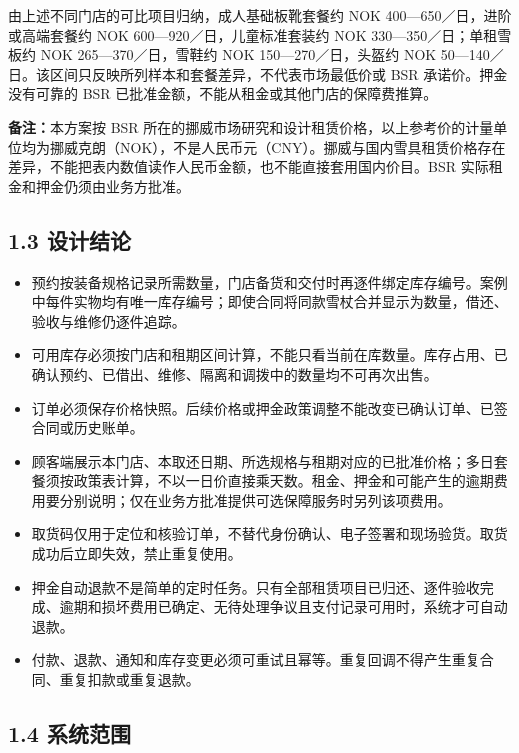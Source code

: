 由上述不同门店的可比项目归纳，成人基础板靴套餐约 NOK 400---650／日，进阶或高端套餐约 NOK 600---920／日，儿童标准套装约 NOK 330---350／日；单租雪板约 NOK 265---370／日，雪鞋约 NOK 150---270／日，头盔约 NOK 50---140／日。该区间只反映所列样本和套餐差异，不代表市场最低价或 BSR 承诺价。押金没有可靠的 BSR 已批准金额，不能从租金或其他门店的保障费推算。

\textbf{备注：}本方案按 BSR 所在的挪威市场研究和设计租赁价格，以上参考价的计量单位均为挪威克朗（NOK），不是人民币元（CNY）。挪威与国内雪具租赁价格存在差异，不能把表内数值读作人民币金额，也不能直接套用国内价目。BSR 实际租金和押金仍须由业务方批准。

\subsection{1.3 设计结论}

\begin{itemize}
\item
  预约按装备规格记录所需数量，门店备货和交付时再逐件绑定库存编号。案例中每件实物均有唯一库存编号；即使合同将同款雪杖合并显示为数量，借还、验收与维修仍逐件追踪。
\item
  可用库存必须按门店和租期区间计算，不能只看当前在库数量。库存占用、已确认预约、已借出、维修、隔离和调拨中的数量均不可再次出售。
\item
  订单必须保存价格快照。后续价格或押金政策调整不能改变已确认订单、已签合同或历史账单。
\item
  顾客端展示本门店、本取还日期、所选规格与租期对应的已批准价格；多日套餐须按政策表计算，不以一日价直接乘天数。租金、押金和可能产生的逾期费用要分别说明；仅在业务方批准提供可选保障服务时另列该项费用。
\item
  取货码仅用于定位和核验订单，不替代身份确认、电子签署和现场验货。取货成功后立即失效，禁止重复使用。
\item
  押金自动退款不是简单的定时任务。只有全部租赁项目已归还、逐件验收完成、逾期和损坏费用已确定、无待处理争议且支付记录可用时，系统才可自动退款。
\item
  付款、退款、通知和库存变更必须可重试且幂等。重复回调不得产生重复合同、重复扣款或重复退款。
\end{itemize}

\subsection{1.4 系统范围}

